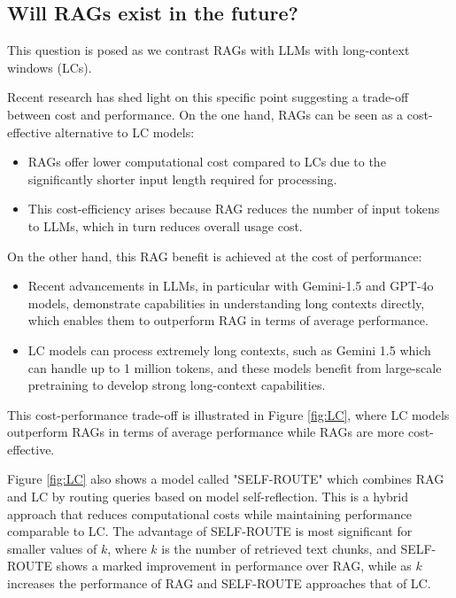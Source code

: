 \subsection{Will RAGs exist in the future?}

This question is posed as we contrast RAGs with LLMs with long-context windows (LCs).

Recent research has shed light on this specific point  suggesting a trade-off between cost and performance. On the one hand, RAGs can be seen as a cost-effective alternative to LC models:
\begin{itemize}
\item RAGs offer lower computational cost compared to LCs due to the significantly shorter input length required for processing.
\item This cost-efficiency arises because RAG reduces the number of input tokens to LLMs, which in turn reduces overall usage cost.
\end{itemize}

On the other hand, this RAG benefit is achieved at the cost of performance:
\begin{itemize}
\item Recent advancements in LLMs, in particular with Gemini-1.5 and GPT-4o models, demonstrate capabilities in understanding long contexts directly, which enables them to outperform RAG in terms of average performance.
\item LC models can process extremely long contexts, such as Gemini 1.5 which can handle up to 1 million tokens, and these models benefit from large-scale pretraining to develop strong long-context capabilities.
\end{itemize}

This cost-performance trade-off is illustrated in Figure \ref{fig:LC}, where LC models outperform RAGs in terms of average performance while RAGs are more cost-effective.

Figure \ref{fig:LC} also shows a model called "SELF-ROUTE" which combines RAG and LC by routing queries based on model self-reflection. This is a hybrid approach that reduces computational costs while maintaining performance comparable to LC. The advantage of SELF-ROUTE is most significant for smaller values of $k$, where $k$ is the number of retrieved text chunks, and SELF-ROUTE shows a marked improvement in performance over RAG, while as $k$ increases the performance of RAG and SELF-ROUTE approaches that of LC.

